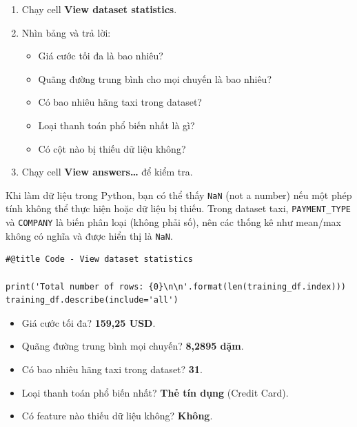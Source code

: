 \documentclass[12pt,a4paper]{article}
\begin{document}
\begin{phuongphap}[title={Hướng dẫn}]
\begin{enumerate}
  \item Chạy cell \textbf{View dataset statistics}.
  \item Nhìn bảng và trả lời:
  \begin{itemize}
    \item Giá cước tối đa là bao nhiêu?
    \item Quãng đường trung bình cho mọi chuyến là bao nhiêu?
    \item Có bao nhiêu hãng taxi trong dataset?
    \item Loại thanh toán phổ biến nhất là gì?
    \item Có cột nào bị thiếu dữ liệu không?
  \end{itemize}
  \item Chạy cell \textbf{View answers\ldots} để kiểm tra.
\end{enumerate}
\end{phuongphap}

\begin{luuy}[title={Vì sao có NaN trong bảng \texttt{describe}?}]
Khi làm dữ liệu trong Python, bạn có thể thấy \texttt{NaN} (not a number) nếu một phép tính không thể thực hiện hoặc dữ liệu bị thiếu.
Trong dataset taxi, \texttt{PAYMENT\_TYPE} và \texttt{COMPANY} là biến phân loại (không phải số), nên các thống kê như mean/max không có nghĩa và được hiển thị là \texttt{NaN}.
\end{luuy}

\begin{lstlisting}
#@title Code - View dataset statistics

print('Total number of rows: {0}\n\n'.format(len(training_df.index)))
training_df.describe(include='all')
\end{lstlisting}

\begin{vidu}[title={Đáp án tham khảo}]
\begin{itemize}
  \item Giá cước tối đa? \textbf{159{,}25 USD}.
  \item Quãng đường trung bình mọi chuyến? \textbf{8{,}2895 dặm}.
  \item Có bao nhiêu hãng taxi trong dataset? \textbf{31}.
  \item Loại thanh toán phổ biến nhất? \textbf{Thẻ tín dụng} (Credit Card).
  \item Có feature nào thiếu dữ liệu không? \textbf{Không}.
\end{itemize}
\end{vidu}
\end{document}
